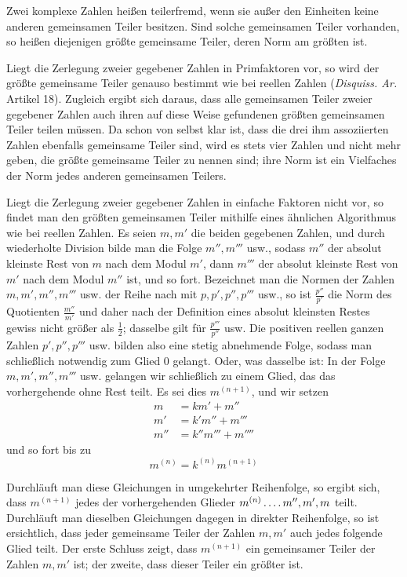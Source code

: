 Zwei komplexe Zahlen heißen teilerfremd, wenn sie außer den Einheiten keine anderen gemeinsamen Teiler besitzen. Sind solche gemeinsamen Teiler vorhanden, so heißen diejenigen größte gemeinsame Teiler, deren Norm am größten ist.

Liegt die Zerlegung zweier gegebener Zahlen in Primfaktoren vor, so wird der größte gemeinsame Teiler genauso bestimmt wie bei reellen Zahlen (\emph{Disquiss. Ar.} Artikel 18). Zugleich ergibt sich daraus, dass alle gemeinsamen Teiler zweier gegebener Zahlen auch ihren auf diese Weise gefundenen größten gemeinsamen Teiler teilen müssen. Da schon von selbst klar ist, dass die drei ihm assoziierten Zahlen ebenfalls gemeinsame Teiler sind, wird es stets vier Zahlen und nicht
%
mehr geben, die größte gemeinsame Teiler zu nennen sind; ihre Norm ist ein Vielfaches der Norm jedes anderen gemeinsamen Teilers.

Liegt die Zerlegung zweier gegebener Zahlen in einfache Faktoren nicht vor, so findet man den größten gemeinsamen Teiler mithilfe eines ähnlichen Algorithmus wie bei reellen Zahlen. Es seien $m,m'$ die beiden gegebenen Zahlen, und durch wiederholte Division bilde man die Folge $m'',m'''$ usw., sodass $m''$ der absolut kleinste Rest von $m$ nach dem Modul $m'$, dann $m'''$ der absolut kleinste Rest von $m'$ nach dem Modul $m''$ ist, und so fort. Bezeichnet man die Normen der Zahlen $m,m',m'',m'''$ usw. der Reihe nach mit $p,p',p'',p'''$ usw., so ist $\frac{p''}{p'}$ die Norm des Quotienten $\frac{m''}{m'}$ und daher nach der Definition eines absolut kleinsten Restes gewiss nicht größer als $\frac12$; dasselbe gilt für $\frac{p'''}{p''}$ usw. Die positiven reellen ganzen Zahlen $p',p'',p'''$ usw. bilden also eine stetig abnehmende Folge, sodass man schließlich notwendig zum Glied $0$ gelangt. Oder, was dasselbe ist: In der Folge $m,m',m'',m'''$ usw. gelangen wir schließlich zu einem Glied, das das vorhergehende ohne Rest teilt. Es sei dies $m^{(n+1)}$, und wir setzen
\[
\begin{aligned}
m&=km'+m''\\
m'&=k'm''+m'''\\
m''&=k''m'''+m''''
\end{aligned}
\]
und so fort bis zu
\[
m^{(n)}=k^{(n)}m^{(n+1)}
\]

Durchläuft man diese Gleichungen in umgekehrter Reihenfolge, so ergibt sich, dass $m^{(n+1)}$ jedes der vorhergehenden Glieder $m^{(n)}\mathinner{.\,.\,.\,.} m'',m',m$ teilt. Durchläuft man dieselben Gleichungen dagegen in direkter Reihenfolge, so ist ersichtlich, dass jeder gemeinsame Teiler der Zahlen $m,m'$ auch jedes folgende Glied teilt. Der erste Schluss zeigt, dass $m^{(n+1)}$ ein gemeinsamer Teiler der Zahlen $m,m'$ ist; der zweite, dass dieser Teiler ein größter ist.

